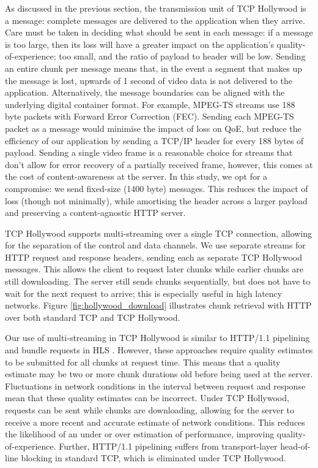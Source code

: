 As discussed in the previous section, the transmission unit of TCP Hollywood is a message:
complete messages are delivered to the application when they arrive. Care must be taken in
deciding what should be sent in each message: if a message is too large, then its loss
will have a greater impact on the application's quality-of-experience; too small, and the
ratio of payload to header will be low. Sending an entire chunk per message means that,
in the event a segment that makes up the message is lost, upwards of 1 second of video
data is not delivered to the application. Alternatively, the message boundaries can be aligned with the underlying digital container format. For example, MPEG-TS streams use 188 byte packets with Forward Error Correction (FEC). Sending each MPEG-TS packet as a message would minimise the impact of loss on QoE, but reduce the efficiency of our application by sending a TCP/IP header for every 188 bytes of payload. Sending a single video frame is a reasonable choice for streams that don't allow for error recovery of a partially received frame, however, this comes at the cost of content-awareness at the server. In this study, we opt for a compromise: we send fixed-size (1400 byte) messages. This reduces the impact of loss (though not minimally), while amortising the header across a larger payload and preserving a content-agnostic HTTP server.

TCP Hollywood supports multi-streaming over a single TCP connection, allowing for the
separation of the control and data channels. We use separate streams for HTTP request and
response headers, sending each as separate TCP Hollywood messages. This allows the client
to request later chunks while earlier chunks are still downloading. The server still sends
chunks sequentially, but does not have to wait for the next request to arrive; this is
especially useful in high latency networks. Figure \ref{fig:hollywood_download}
illustrates chunk retrieval with HTTP over both standard TCP and TCP Hollywood.

Our use of multi-streaming in TCP Hollywood is similar to HTTP/1.1 pipelining and bundle
requests in HLS \cite{muller2012evaluation}. However, these approaches require quality
estimates to be submitted for all chunks at request time. This means that a quality
estimate may be two or more chunk durations old before being used at the server.
Fluctuations in network conditions in the interval between request and response mean that
these quality estimates can be incorrect. Under TCP Hollywood, requests can be sent while
chunks are downloading, allowing for the server to receive a more recent and accurate
estimate of network conditions. This reduces the likelihood of an under or over estimation
of performance, improving quality-of-experience. Further, HTTP/1.1 pipelining suffers
from transport-layer head-of-line blocking in standard TCP, which is eliminated under TCP Hollywood.

